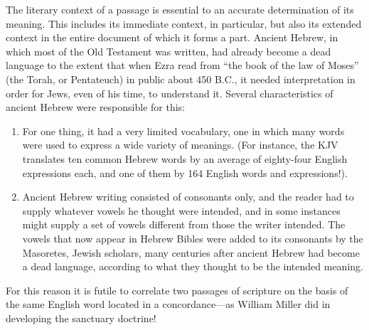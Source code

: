 The literary context of a passage is essential to an accurate determination
of its meaning. This includes its immediate context, in particular, but also
its extended context in the entire document of which it forms a part.
Ancient Hebrew, in which most of the Old Testament was written, had
already become a dead language to the extent that when Ezra read from ``the
book of the law of Moses'' (the Torah, or Pentateuch) in public about 450
B.C., it needed interpretation in order for Jews, even of his time, to
understand it.
\newpage
Several characteristics of ancient Hebrew were responsible for this:
\begin{enumerate}
    \item For
one thing, it had a very limited vocabulary, one in which many words were
used to express a wide variety of meanings. (For instance, the KJV
translates ten common Hebrew words by an average of eighty-four English
expressions each, and one of them by 164 English words and
expressions!\cite{64}). 
    \item Ancient Hebrew writing consisted of consonants only,
and the reader had to supply whatever vowels he thought were intended, and
in some instances might supply a set of vowels different from those the
writer intended. The vowels that now appear in Hebrew Bibles were added to
its consonants by the Masoretes, Jewish scholars, many centuries after
ancient Hebrew had become a dead language, according to what they thought to
be the intended meaning.
\end{enumerate}
For this reason it is futile to correlate two
passages of scripture on the basis of the same English word located in a
concordance---as William Miller did in developing the sanctuary doctrine! 

